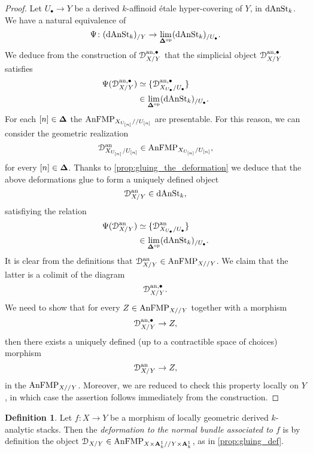 \documentclass[10pt,a4paper,reqno]{amsart} %
\theoremstyle{plain}
\theoremstyle{definition}
\newtheorem{defin}[thm]{Definition}
\theoremstyle{remark}
\numberwithin{equation}{section}
\begin{document}
\begin{proof} Let $U_\bullet \to Y$ be a derived $k$-affinoid \'etale hyper-covering of $Y$, in $\mathrm{dAnSt}_k$. We have a natural equivalence of \infcats
        \[
            \Psi \colon (\mathrm{dAnSt}_k)_{/ Y}  \to \lim_{\bm{\Delta} ^\mathrm{op}} (\mathrm{dAnSt}_k)_{/U_\bullet}.
        \]
    We deduce from the construction of $\mathcal D^{\mathrm{an}, \bullet}_{X/ Y}$ that the simplicial object $\mathcal D^{\mathrm{an}, \bullet}_{X/ Y}$ satisfies
        \begin{align*}
            \Psi(\mathcal D^{\mathrm{an}, \bullet}_{X/ Y}) & \simeq \{ \mathcal D^{\mathrm{an}, \bullet}_{X_{U_\bullet}/ U_\bullet} \} \\
                                                    & \in \lim_{\bm{\Delta} ^\mathrm{op}} (\mathrm{dAnSt}_k)_{/ U_\bullet}.
        \end{align*}
    For each $[n] \in \bm{\Delta}$ the \infcats $\mathrm{AnFMP}_{X_{U_{[n]}}/ /U_{[n]}}$ are presentable. For this reason, we can consider the geometric realization
        \[
            \mathcal D_{X_{U_{[n]}}/ U_{[n]}} ^\mathrm{an} \in \mathrm{AnFMP}_{X_{U_{[n]}} / U_{[n]}},
        \]
    for every $[n] \in \bm{\Delta}$. Thanks to
    \cref{prop:gluing_the_deformation} we deduce that the above deformations glue to form a uniquely defined object
        \[
            \mathcal D^\mathrm{an}_{X/ Y} \in \mathrm{dAnSt}_k,  
        \]
    satisfiying the relation 
        \begin{align*}
            \Psi(\mathcal D^\mathrm{an}_{X/ Y}) & \simeq \{ \mathcal D^\mathrm{an}_{X_{U_\bullet}/ U_\bullet} \} \\
                                & \in \lim_{\bm{\Delta} ^\mathrm{op}} (\mathrm{dAnSt}_k)_{/ U_\bullet}.
        \end{align*}
    It is clear from the definitions that $\mathcal D^\mathrm{an}_{X/ Y} \in \mathrm{AnFMP}_{X/ /Y}$. We claim that the latter is a colimit of the diagram
        \[  
            \mathcal D^{\mathrm{an}, \bullet}_{X/ Y}.
        \]
    We need to show that for every $Z \in \mathrm{AnFMP}_{X/ /Y}$ together with a morphism
        \[
            \mathcal D^{\mathrm{an}, \bullet}_{X/ Y} \to Z,   
        \]
    then there exists a uniquely defined (up to a contractible space of choices) morphism
        \[
            \mathcal D^\mathrm{an}_{X/ Y} \to Z,  
        \]
    in the \infcat $\mathrm{AnFMP}_{X/ /Y}$. Moreover, we are reduced to check this property locally on $Y$, in which case the assertion follows immediately
    from the construction.
\end{proof}

\begin{defin}
    Let $f\colon X \to Y$ be a morphism of locally geometric derived $k$-analytic stacks. Then the \emph{deformation to the normal bundle associated to $f$}
    is by definition the object $\mathcal D_{X/ Y} \in \mathrm{AnFMP}_{X\times \mathbf A^1_k/ /Y\times\mathbf A^1_k}$, as in \cref{prop:gluing_def}. 
\end{defin}
\end{document}
